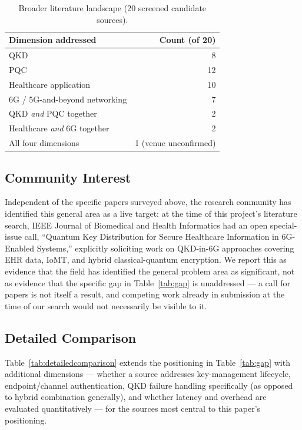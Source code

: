 \documentclass[journal]{IEEEtran}
\begin{document}
\begin{table}[t]
\centering
\caption{Broader literature landscape (20 screened candidate sources).}
\label{tab:landscape}
\small
\begin{tabular}{@{}lr@{}}
\toprule
Dimension addressed & Count (of 20) \\
\midrule
QKD & 8 \\
PQC & 12 \\
Healthcare application & 10 \\
6G / 5G-and-beyond networking & 7 \\
QKD \emph{and} PQC together & 2 \\
Healthcare \emph{and} 6G together & 2 \\
All four dimensions & 1 (venue unconfirmed) \\
\bottomrule
\end{tabular}
\end{table}

\subsection{Community Interest}

Independent of the specific papers surveyed above, the research community has identified this general area as a live target: at the time of this project's literature search, IEEE Journal of Biomedical and Health Informatics had an open special-issue call, ``Quantum Key Distribution for Secure Healthcare Information in 6G-Enabled Systems,'' explicitly soliciting work on QKD-in-6G approaches covering EHR data, IoMT, and hybrid classical-quantum encryption. We report this as evidence that the field has identified the general problem area as significant, not as evidence that the specific gap in Table~\ref{tab:gap} is unaddressed --- a call for papers is not itself a result, and competing work already in submission at the time of our search would not necessarily be visible to it.

\subsection{Detailed Comparison}

Table~\ref{tab:detailedcomparison} extends the positioning in Table~\ref{tab:gap} with additional dimensions --- whether a source addresses key-management lifecycle, endpoint/channel authentication, QKD failure handling specifically (as opposed to hybrid combination generally), and whether latency and overhead are evaluated quantitatively --- for the sources most central to this paper's positioning.
\end{document}
